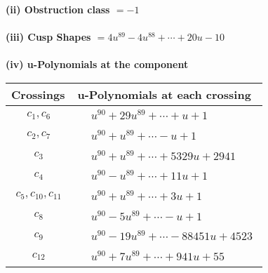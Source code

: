 \documentclass[1p]{elsarticle_modified}
\theoremstyle{definition}
\begin{document}
\flushleft \textbf{(ii) Obstruction class $= -1$}\\~\\
\flushleft \textbf{(iii) Cusp Shapes $= 4 u^{89}-4 u^{88}+\cdots+20 u-10$}\\~\\
\newpage\renewcommand{\arraystretch}{1}
\flushleft \textbf{(iv) u-Polynomials at the component}\newline \\
\begin{tabular}{m{50pt}|m{274pt}}
Crossings & \hspace{64pt}u-Polynomials at each crossing \\
\hline $$\begin{aligned}c_{1},c_{6}\end{aligned}$$&$\begin{aligned}
&u^{90}+29 u^{89}+\cdots+u+1
\end{aligned}$\\
\hline $$\begin{aligned}c_{2},c_{7}\end{aligned}$$&$\begin{aligned}
&u^{90}+u^{89}+\cdots- u+1
\end{aligned}$\\
\hline $$\begin{aligned}c_{3}\end{aligned}$$&$\begin{aligned}
&u^{90}+u^{89}+\cdots+5329 u+2941
\end{aligned}$\\
\hline $$\begin{aligned}c_{4}\end{aligned}$$&$\begin{aligned}
&u^{90}- u^{89}+\cdots+11 u+1
\end{aligned}$\\
\hline $$\begin{aligned}c_{5},c_{10},c_{11}\end{aligned}$$&$\begin{aligned}
&u^{90}+u^{89}+\cdots+3 u+1
\end{aligned}$\\
\hline $$\begin{aligned}c_{8}\end{aligned}$$&$\begin{aligned}
&u^{90}-5 u^{89}+\cdots- u+1
\end{aligned}$\\
\hline $$\begin{aligned}c_{9}\end{aligned}$$&$\begin{aligned}
&u^{90}-19 u^{89}+\cdots-88451 u+4523
\end{aligned}$\\
\hline $$\begin{aligned}c_{12}\end{aligned}$$&$\begin{aligned}
&u^{90}+7 u^{89}+\cdots+941 u+55
\end{aligned}$\\
\hline
\end{tabular}\\~\\
\end{document}
